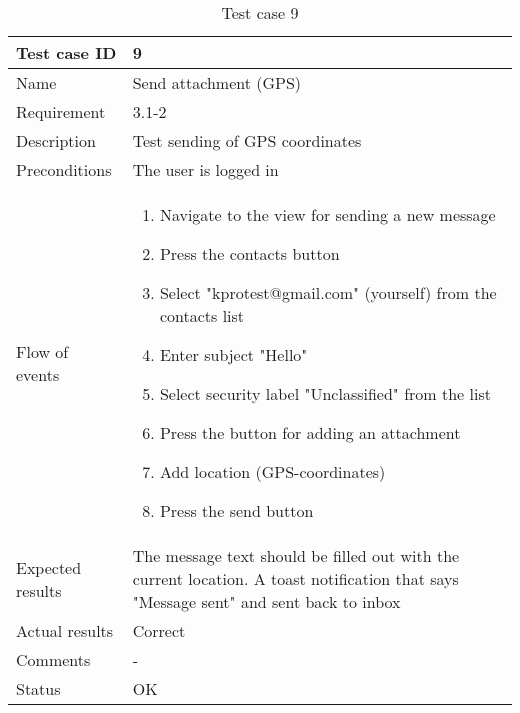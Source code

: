 		\begin{table}
			\begin{tabular}{l|p{10cm}}
				Test case ID & 9 \\ \hline
				Name & Send attachment (GPS)\\ \hline
				Requirement & 3.1-2\\ \hline
				Description & Test sending of GPS coordinates\\ \hline
				Preconditions & The user is logged in\\ \hline
				Flow of events & 
					\begin{enumerate}
						\item{}Navigate to the view for sending a new message
						\item{}Press the contacts button
						\item{}Select "kprotest@gmail.com" (yourself) from the contacts list
						\item{}Enter subject "Hello"
						\item{}Select security label "Unclassified" from the list
						\item{}Press the button for adding an attachment
						\item{}Add location (GPS-coordinates)
						\item{}Press the send button
					\end{enumerate} \\ \hline
				Expected results & The message text should be filled out with the current location. A toast notification that says "Message sent" and sent back to inbox\\ \hline
				Actual results &Correct\\ \hline
				Comments &-\\ \hline
				Status &OK\\ \hline
			\end{tabular}
			\caption{Test case 9} \label{tab:case9}
		\end{table}

